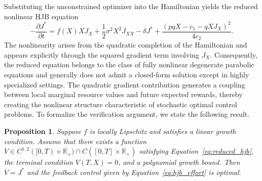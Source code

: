 \documentclass[11pt]{article}
\newtheorem{prop}[theorem]{\bf Proposition}
\begin{document}
	Substituting the unconstrained optimizer into the Hamiltonian yields the reduced nonlinear HJB equation
	\begin{equation}
		-\frac{\partial J^*}{\partial t}
		=
		f(X)XJ_X
		+
		\frac{1}{2}\sigma^2X^2J_{XX}
		-\delta J^*
		+
		\frac{\left(pqX-c_1-qXJ_X\right)^2}{4c_2}.
		\label{eq:reduced_hjb}
	\end{equation}
	The nonlinearity arises from the quadratic completion of the Hamiltonian and appears explicitly through the squared gradient term involving $J_X$. Consequently, the reduced equation belongs to the class of fully nonlinear degenerate parabolic equations and generally does not admit a closed-form solution except in highly specialized settings. The quadratic gradient contribution generates a coupling between local marginal resource values and future expected rewards, thereby creating the nonlinear structure characteristic of stochastic optimal control problems. To formalize the verification argument, we state the following result.
	
	\begin{prop}\label{p2}
		Suppose $f$ is locally Lipschitz and satisfies a linear growth condition. Assume that there exists a function $V\in C^{1,2}([0,T)\times\mathbb{R}_+)\cap C([0,T]\times\mathbb{R}_+)$ satisfying Equation~\eqref{eq:reduced_hjb}, the terminal condition $V(T,X)=0$, and a polynomial growth bound. Then $V=J^*$ and the feedback control given by Equation~\eqref{eq:hjb_effort} is optimal.
	\end{prop}
	
\end{document}
